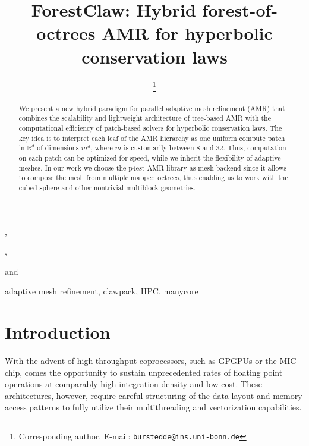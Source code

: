 \documentclass{IOS-Book-Article}     %
\newcommand{\sR}{\mathbb{R}}
\begin{document}
\begin{frontmatter}          %
%
\title{ForestClaw:
        Hybrid forest-of-octrees AMR for hyperbolic conservation laws}

%
\author[A]{ %
\thanks{Corresponding author.  E-mail: \texttt{burstedde@ins.uni-bonn.de}}},
\author[B]{ },
\author[C]{ } and
\author[C]{ }
\address[A]{Institut f\"ur Numerische Simulation, Universit\"at Bonn, Germany}
\address[B]{Boise State University, Idaho, USA}
\address[C]{Institute for Computational Engineering and Sciences,\\
The University of Texas at Austin, USA}

\begin{abstract}
%
We present a new hybrid paradigm for parallel adaptive mesh refinement (AMR)
that combines the scalability and lightweight architecture of tree-based AMR
with the computational efficiency of patch-based solvers for hyperbolic
conservation laws.  The key idea is to interpret each leaf of the AMR hierarchy
as one uniform compute patch in $\sR^d$ of dimensions $m^d$, where $m$ is
customarily between 8 and 32.  Thus, computation on each patch can be optimized
for speed, while we inherit the flexibility of adaptive meshes.  In our work we
choose the p4est AMR library as mesh backend since it allows to compose the
mesh from multiple mapped octrees, thus enabling us to work with the cubed
sphere and other nontrivial multiblock geometries.
%
\end{abstract}

\begin{keyword}
adaptive mesh refinement,
clawpack,
HPC,
manycore
\end{keyword}

\end{frontmatter}


\section*{Introduction}

With the advent of high-throughput coprocessors, such as GPGPUs or the MIC
chip, comes the opportunity to sustain unprecedented rates of floating point
operations at comparably high integration density and low cost.  These
architectures, however, require careful structuring of the data layout and
memory access patterns to fully utilize their multithreading and vectorization
capabilities.
\end{document}
